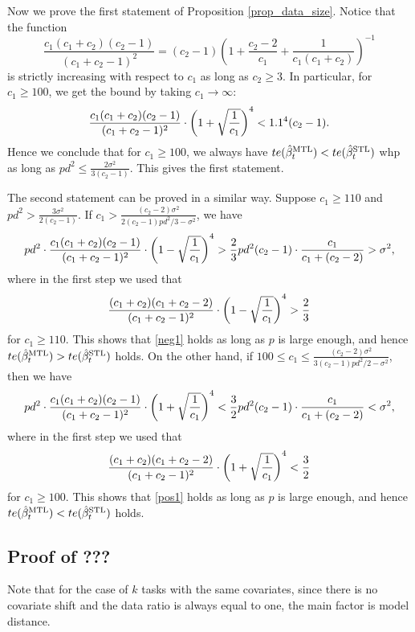 Now we prove the first statement of Proposition \ref{prop_data_size}. Notice that the function
$$ \frac{c_1(c_1+c_2)(c_2-1)}{(c_1+c_2-1)^2} =(c_2-1) \left(1 +\frac{c_2-2}{c_1}+\frac{1}{c_1(c_1+c_2)}\right)^{-1} $$
is strictly increasing with respect to $c_1$ as long as $c_2\ge 3$. In particular, for $c_1\ge 100$, we get the bound by taking $c_1\to \infty$:
$$\frac{c_1(c_1+c_2)(c_2-1)}{(c_1+c_2-1)^2} \cdot \left({1 + \sqrt{\frac{1}{c_1}}}\right)^4 < 1.1^4 (c_2-1).$$
 Hence we conclude that for $c_1\ge 100$, we always have $te(\hat{\beta}_t^{\text{MTL}}) < te(\hat{\beta}_t^{\text{STL}})$ whp as long as $pd^2 \le \frac{2\sigma^2}{3(c_2-1)}$. This gives the first statement. 

The second statement can be proved in a similar way. Suppose $c_1 \ge 110$ and $pd^2 > \frac{3\sigma^2}{2(c_2-1)}$. If $c_1 > \frac{(c_2-2) \sigma^2}{2(c_2 - 1) pd^2/3 - \sigma^2}$, we have
\begin{align*}
 pd^2 \cdot \frac{c_1(c_1+c_2)(c_2-1)}{(c_1+c_2-1)^2}  \cdot \left({1 - \sqrt{\frac{1}{c_1}}}\right)^4 > \frac{2}{3} pd^2(c_2-1)\cdot \frac{c_1 }{c_1+(c_2-2)}  >\sigma^2, 
 \end{align*}
 where in the first step we used that 
 $$ \frac{(c_1+c_2)(c_1+c_2-2)}{(c_1+c_2-1)^2}  \cdot \left({1 - \sqrt{\frac{1}{c_1}}}\right)^4 > \frac23$$
 for $c_1 \ge 110$. This shows that \eqref{neg1} holds as long as $p$ is large enough, and hence $te(\hat{\beta}_t^{\text{MTL}})> te(\hat{\beta}_t^{\text{STL}})$ holds. On the other hand, if $100\le c_1 \le \frac{(c_2-2) \sigma^2}{3(c_2 - 1) pd^2/2 - \sigma^2}$, then we have 
 \begin{align*}
 pd^2 \cdot \frac{c_1(c_1+c_2)(c_2-1)}{(c_1+c_2-1)^2}  \cdot \left({1 + \sqrt{\frac{1}{c_1}}}\right)^4 < \frac{3}{2} pd^2(c_2-1)\cdot \frac{c_1 }{c_1+(c_2-2)}  < \sigma^2, 
 \end{align*}
 where in the first step we used that 
 $$ \frac{(c_1+c_2)(c_1+c_2-2)}{(c_1+c_2-1)^2}  \cdot \left({1 + \sqrt{\frac{1}{c_1}}}\right)^4 < \frac32$$
 for $c_1 \ge 100$. This shows that \eqref{pos1} holds as long as $p$ is large enough, and hence $te(\hat{\beta}_t^{\text{MTL}})< te(\hat{\beta}_t^{\text{STL}})$ holds.
 



\subsection{Proof of ???}
Note that for the case of $k$ tasks with the same covariates, since there is no covariate shift and the data ratio is always equal to one, the main factor is model distance.

